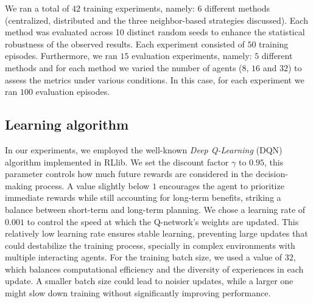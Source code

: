 \documentclass[sigconf]{acmart}
\begin{document}
We ran a total of $42$ training experiments, 
namely: $6$ different methods %
  (centralized, distributed and the three neighbor-based strategies discussed).
Each method was evaluated across 10 distinct random seeds to enhance the statistical robustness of the observed results.
%
Each experiment consisted of $50$ training episodes. 
%
Furthermore, we ran $15$ evaluation experiments, namely: $5$ different methods and for each method 
  we varied the number of agents ($8$, $16$ and $32$) to assess the metrics under various conditions.
  In this case, for each experiment we ran $100$ evaluation episodes.

\subsection{Learning algorithm}
In our experiments, we employed the well-known \emph{Deep Q-Learning} (DQN) algorithm implemented in RLlib.
%
We set the discount factor $\gamma$ to $0.95$, this parameter controls how much future rewards are 
  considered in the decision-making process.
%
A value slightly below $1$ encourages the agent to prioritize immediate rewards while still accounting 
  for long-term benefits, striking a balance between short-term and long-term planning.
%
We chose a learning rate of $0.001$ to control the speed at which the Q-network's weights are updated.
%
This relatively low learning rate ensures stable learning, preventing large updates that could destabilize 
  the training process, specially in complex environments with multiple interacting agents.
%
For the training batch size, we used a value of $32$, which balances computational efficiency and the diversity 
  of experiences in each update. 
%
A smaller batch size could lead to noisier updates, while a larger one might slow down training without
  significantly improving performance.
%
\end{document}
